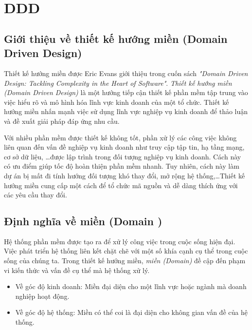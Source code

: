 \chapter{DDD}

\section{Giới thiệu về thiết kế hướng miền (Domain Driven Design)}

Thiết kế hướng miền được Eric Evans giới thiệu trong cuốn sách \emph{"Domain Driven Design: Tackling Complexity in the Heart of Software"}. \emph{Thiết kế hướng miền (Domain Driven Design)} là một hướng tiếp cận thiết kế phần mềm tập trung vào việc hiểu rõ và mô hình hóa lĩnh vực kinh doanh của một tổ chức. Thiết kế hướng miền nhấn mạnh việc sử dụng lĩnh vực nghiệp vụ kinh doanh để thảo luận và đề xuất giải pháp đáp ứng nhu cầu.



Với nhiều phần mềm được thiết kế không tốt, phần xử lý các công việc không liên quan đến vấn đề nghiệp vụ kinh doanh như truy cập tập tin, hạ tầng mạng, cơ sở dữ liệu, \dots được lập trình trong đối tượng nghiệp vụ kinh doanh. Cách này có ưu điểm  giúp tốc độ hoàn thiện  phần mềm nhanh. Tuy nhiên, cách này làm dự án bị mất đi tính hướng đối tượng khó        thay đổi, mở rộng hệ thống,\dots Thiết kế hướng miền cung cấp một cách để tổ chức mã nguồn và dễ dàng thích ứng với các yêu cầu thay đổi.

\section{Định nghĩa về miền (Domain    )}

Hệ thống phần mềm được tạo ra để xử lý công việc trong cuộc sống hiện đại. Việc phát triển hệ thống liên kết chặt chẽ với một số khía cạnh cụ thể trong cuộc sống của chúng ta. Trong thiết kế hướng miền, \emph{miền (Domain)} đề cập đến phạm vi kiến thức và vấn đề cụ thể mà hệ thống xử lý.

\begin{itemize}

    \item Về góc độ kinh doanh: Miền đại diện cho một lĩnh vực hoặc ngành mà doanh nghiệp hoạt động.

    \item Về góc độ hệ thống: Miền có thể coi là đại diện cho không gian vấn đề của hệ thống.

\end{itemize}

